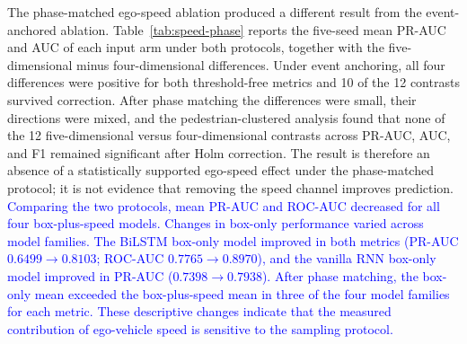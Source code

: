 \documentclass[mti,article,submit,moreauthors]{Definitions/mdpi}
\begin{document}
The phase-matched ego-speed ablation produced a different result from the event-anchored ablation. Table~\ref{tab:speed-phase} reports the five-seed mean PR-AUC and AUC of each input arm under both protocols, together with the five-dimensional minus four-dimensional differences. Under event anchoring, all four differences were positive for both threshold-free metrics and 10 of the 12 contrasts survived correction. After phase matching the differences were small, their directions were mixed, and the pedestrian-clustered analysis found that none of the 12 five-dimensional versus four-dimensional contrasts across PR-AUC, AUC, and F1 remained significant after Holm correction. The result is therefore an absence of a statistically supported ego-speed effect under the phase-matched protocol; it is not evidence that removing the speed channel improves prediction. \textcolor{blue}{Comparing the two protocols, mean PR-AUC and ROC-AUC decreased for all
four box-plus-speed models. Changes in box-only performance varied
across model families. The BiLSTM box-only model improved in both
metrics (PR-AUC $0.6499 \rightarrow 0.8103$; ROC-AUC
$0.7765 \rightarrow 0.8970$), and the vanilla RNN box-only model
improved in PR-AUC ($0.7398 \rightarrow 0.7938$).
After phase matching, the box-only mean exceeded the box-plus-speed
mean in three of the four model families for each metric.
These descriptive changes indicate that the measured contribution
of ego-vehicle speed is sensitive to the sampling protocol.} %
\end{document}
